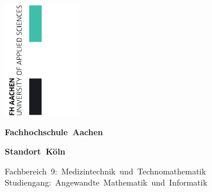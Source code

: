 \begin{titlepage}
	\setlength{\parindent}{0pt} %
	
	\begin{flushright}
		\includegraphics[height=5cm]{images/FH-Aachen-r_svg-raw}
	\end{flushright}
	
	\vspace*{-2.5cm}

	\begin{center}
		\textbf{\Huge Fachhochschule~Aachen}

		\vspace*{0.5cm}
		
		\textbf{\Huge Standort~Köln}

		\vspace*{0.75cm}

		{\normalsize\doublespacing Fachbereich~9:~Medizintechnik~und~Technomathematik\\	Studiengang:~Angewandte~Mathematik~und~Informatik}

		\vspace*{2.5cm} %
		
		\begin{minipage}[t]{17cm} %
			\begin{center}
				\textbf{\Huge \titleDocument}
			\end{center}
		\end{minipage}
	
		\vspace*{2.5cm} %
		

\end{center}
\end{titlepage}
